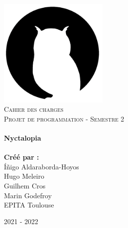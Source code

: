 \begin{titlepage}
    \vbox{ }

    \vbox{ }

    \begin{center}
        \includegraphics[width=0.40\textwidth]{img/logo.png}\\[1cm]
        \textsc{\Large Cahier des charges}\\[0.2cm]
        \textsc{\Large Projet de programmation - Semestre 2}\\[0.6cm]

        \noindent\makebox[\linewidth]{\rule{.7\paperwidth}{.6pt}}\\[0.7cm]
        { \huge \bfseries Nyctalopia}\\[0.25cm]
        \noindent\makebox[\linewidth]{\rule{.7\paperwidth}{.6pt}}\\[0.7cm]
        \large{\bfseries Créé par :}\\[0.1cm]
        \large{Íñigo Aldaraborda-Hoyos}\\[0.1cm]
        \large{Hugo Meleiro}\\[0.1cm]
        \large{Guilhem Cros}\\[0.1cm]
        \large{Marin Godefroy}\\[0.1cm]
        \vfill
        \large
        EPITA Toulouse

            {\large 2021 - 2022}
    \end{center}
\end{titlepage}

